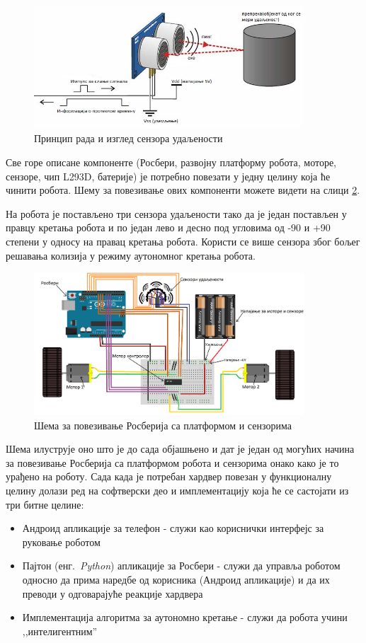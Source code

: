 \documentclass[12pt,oneside]{memoir}
\theoremstyle{remark}
\begin{document}
\begin{figure}[!ht]
\centering
\includegraphics[width=0.9\textwidth]{slike/UltrasonicSensors.jpg}
\caption{Принцип рада и изглед сензора удаљености }
\label{fig:ultrasonicsensor}
\end{figure}

Све горе описане компоненте (Росбери, развојну платформу робота, моторе, сензоре, чип L293D, батерије) је потребно повезати у једну целину која ће чинити робота. Шему за повезивање ових компоненти можете видети на слици \ref{fig:mainshema}.

На робота је постављено три сензора удаљености тако да је један постављен у правцу кретања робота и по један лево и десно под угловима од -90 и +90 степени у односу на правац кретања робота. Користи се више сензора због бољег решавања колизија у режиму аутономног кретања робота.

\begin{figure}[!ht]
\centering
\includegraphics[width=0.9\textwidth]{slike/shema.png}
\caption{Шема за повезивање Росберија са платформом и сензорима }
\label{fig:mainshema}
\end{figure}

Шема илуструје оно што је до сада објашњено и дат је један од могућих начина за повезивање Росберија са платформом робота и сензорима онако како је то урађено на роботу. Сада када је потребан хардвер повезан у функционалну целину долази ред на софтверски део и имплементацију која ће се састојати из три битне целине:
\begin{itemize}
\item Андроид апликације за телефон - служи као кориснички интерфејс за руковање роботом
\item Пајтон  (енг.~{\em Python}) апликације за Росбери - служи да управља роботом односно да прима наредбе од корисника (Андроид апликације) и да их преводи у одговарајуће реакције хардвера
\item Имплементација алгоритма за аутономно кретање - служи да робота учини ,,интелигентним''
\end{itemize}
\end{document}
